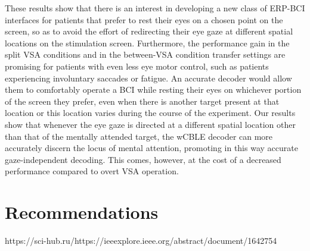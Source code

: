 These results show that there is an interest in developing a new class of ERP-BCI
interfaces for patients that prefer to rest their eyes on a chosen point on the
screen, so as to avoid the effort of redirecting their eye gaze at different spatial locations on
the stimulation screen. Furthermore, the performance gain in the split VSA conditions
and in the between-VSA condition transfer settings are promising for patients with even
less eye motor control, such as patients experiencing involuntary saccades or
fatigue. An accurate decoder would allow them to comfortably operate a BCI while
resting their eyes on whichever portion of the screen they prefer, even when there is
another target present at that location or this location varies during the course of the
experiment. Our results show that whenever the eye gaze is directed at a different
spatial location other than that of the mentally attended target, the wCBLE decoder can
more accurately discern the locus of mental attention, promoting in this way accurate
gaze-independent decoding. This comes, however, at the cost of a decreased performance
compared to overt VSA operation.

\section{Recommendations}
https://sci-hub.ru/https://ieeexplore.ieee.org/abstract/document/1642754
